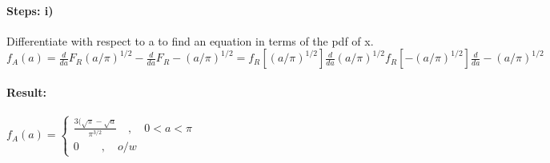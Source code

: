 \paragraph{Steps: i)} Differentiate with respect to a to find an equation in terms of the pdf of x.\\ ${f}_{A}(a)=\frac{d}{da}{F}_{R}(a/\pi)^{1/2}-\frac{d}{da}{F}_{R}-(a/\pi)^{1/2}= {f}_{R}[(a/\pi)^{1/2}]\frac{d}{da}(a/\pi)^{1/2} {f}_{R}[-(a/\pi)^{1/2}]\frac{d}{da}-(a/\pi)^{1/2}$


\paragraph{Result:} ${ f }_{ A }(a)=\begin{cases} \frac{ 3(\sqrt{\pi}-\sqrt{a}}{\pi^{3/2}} \quad ,\quad 0<a<\pi \\ 0\quad  \quad ,\quad o/w \end{cases}$